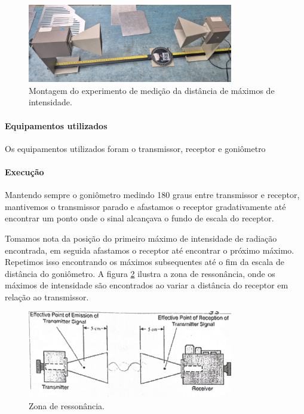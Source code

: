 \documentclass[12pt]{article}
\begin{document}
\begin{figure}[H]
  \centering
  \includegraphics[width=0.8\textwidth]{img/metodo1montagem.png}
  \caption{Montagem do experimento de medição da distância de máximos
  de intensidade.}
  \label{fig:img/metodo1montagem.png}
\end{figure}

\paragraph{Equipamentos utilizados}
Os equipamentos utilizados foram o transmissor, receptor e goniômetro

\paragraph{Execução}
Mantendo sempre o goniômetro medindo 180 graus entre transmissor e
receptor, mantivemos o transmissor parado e afastamos o receptor
gradativamente até encontrar um ponto onde o sinal alcançava o fundo
de escala do receptor.

Tomamos nota da posição do primeiro máximo de intensidade de radiação
encontrada, em seguida afastamos o receptor até encontrar o próximo
máximo. Repetimos isso encontrando os máximos subsequentes até o fim
da escala de distância do goniômetro. A figura
\ref{fig:img/metodo1cavidaderessonante.png}
ilustra a zona de ressonância, onde os máximos de intensidade
são encontrados ao variar a distância do receptor em relação ao
transmissor.

\begin{figure}[H]
  \centering
  \includegraphics[width=0.8\textwidth]{img/metodo1cavidaderessonante.png}
  \caption{Zona de ressonância.}
  \label{fig:img/metodo1cavidaderessonante.png}
\end{figure}
\end{document}

